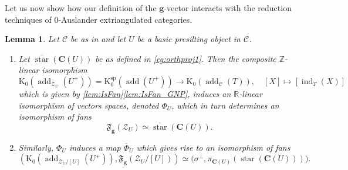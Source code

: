 \documentclass[10pt,twoside, a4paper,reqno]{amsart}
\DeclareMathOperator{\add}{add}
\DeclareMathOperator{\ind}{ind}
\DeclareMathOperator{\starr}{star}
\newcommand{\partfan}[1]{\mathfrak{F}_{\bfg}(#1)}
\newcommand{\R}{\mathbb{R}}
\newcommand{\calC}{\mathcal{C}}
\newcommand{\calZ}{\mathcal{Z}}
\newcommand{\boldC}{\mathbf{C}}
\newcommand{\K}{\mathrm{K}}
\newcommand{\Ksp}{\mathrm{K}^{\mathrm{sp}}}
\newcommand{\bfg}{\mathbf{g}}
\newcommand{\Z}{\mathbb{Z}}
\newtheorem{lemma}[theorem]{Lemma}
\theoremstyle{definition}
\begin{document}
Let us now show how our definition of the $\bfg$-vector interacts with the reduction techniques of 0-Auslander extriangulated categories.

\begin{lemma}\label{lem:ZUfan}
{Let $\calC$ be as in } and let $U$ be a basic presilting object in $\calC$. 
    \begin{enumerate}
        \item\label{lem:ZUfan1} Let $\overline{\starr}(\boldC(U))$ be as defined in \eqref{eg:orthproj1}.
    Then the composite $\Z$-linear isomorphism
    \[ \K_0(\add_{\calZ_U} (U^+)) = \Ksp_0(\add (U^+))  \to \K_0( \add_{\calC} (T)), \quad [X] \mapsto [ \ind_T(X)] \]
    which is given by \cref{lem:IsFan}\eqref{lem:IsFan_GNP}, induces an $\R$-linear isomorphism of vectors spaces, denoted $\Phi_U$, which in turn determines an isomorphism of fans 
    \[\partfan{\calZ_U} \simeq \overline{\starr}(\boldC(U)). \]
    \item\label{lem:ZUfan2} {Similarly, $\Phi_U$ induces a map $\overline{\Phi}_U$ which gives rise to} an isomorphism of fans
    \[ ( \K_0(\add_{\calZ_U/[U]} (U^+)),\partfan{\calZ_U/[U]}) \simeq {(\sigma^\perp,} \pi_{\boldC(U)}(\starr(\boldC(U)))). \]
    \end{enumerate}
\end{lemma}
\end{document}
